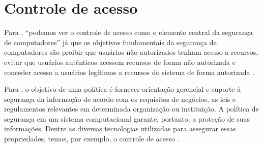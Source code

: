 



\section{Controle de acesso}\label{sec:controle_acesso}
Para , ``podemos ver o controle de acesso como o elemento central da segurança de computadores'' já que os objetivos fundamentais da segurança de computadores são proibir  que usuários não autorizados tenham acesso a recursos, evitar que usuários autênticos acessem recursos de forma não autorizada e conceder acesso a usuários legítimos a recursos do sistema de forma autorizada \cite[p. 97]{stallings_seguranccomputadores_2017}.

Para , o objetivo de uma política é fornecer orientação gerencial e suporte à segurança da informação de acordo com os requisitos de negócios, as leis e regulamentos relevantes em determinada organização ou instituição. A política de segurança em um sistema computacional garante, portanto, a proteção de suas informações. Dentre as diversas tecnologias utilizadas para assegurar essas propriedades, temos, por exemplo, o controle de acesso \cite{samarati_access_2001}. %


